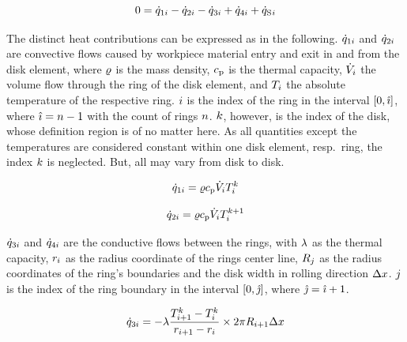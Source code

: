 \documentclass{PyRollDocs}
\begin{document}
    \begin{equation}
        0 = {\dot{q}}_{1{i}} - {\dot{q}}_{2{i}} - {\dot{q}}_{3{i}} + {\dot{q}}_{4{i}} + {\dot{q}_\mathrm{S}}{}_{{i}}
        \label{eq:heat_flow_balance}
    \end{equation}

    The distinct heat contributions can be expressed as in the following.
    ${\dot{q}}_{1{i}}$ and ${\dot{q}}_{2{i}}$ are convective flows caused by workpiece material entry and exit in and from the disk element, where ${\varrho}$ is the mass density, ${c_\mathrm{p}}$ is the thermal capacity, ${\dot{V}}_{i}$ the volume flow through the ring of the disk element, and ${T}_{i}$ the absolute temperature of the respective ring.
    ${i}$ is the index of the ring in the interval $[0, {\hat{\imath}}]$, where ${\hat{\imath}} = {n} - 1$ with the count of rings ${n}$.
    ${k}$, however, is the index of the disk, whose definition region is of no matter here.
    As all quantities except the temperatures are considered constant within one disk element, resp.\ ring, the index ${k}$ is neglected.
    But, all may vary from disk to disk.

    \begin{equation}
        {\dot{q}}_{1{i}} = {\varrho} {c_\mathrm{p}} {\dot{V}}_{i} {T}_{{i}}^{{k}}
        \label{eq:heat_flow_1}
    \end{equation}

    \begin{equation}
        {\dot{q}}_{2{i}} = {\varrho} {c_\mathrm{p}} {\dot{V}}_{i} {T}_{{i}}^{{k}+1}
        \label{eq:heat_flow_2}
    \end{equation}

    ${\dot{q}}_{3{i}}$ and ${\dot{q}}_{4{i}}$ are the conductive flows between the rings, with ${\lambda}$ as the thermal capacity, ${r}_{i}$ as the radius coordinate of the rings center line, ${R}_{j}$ as the radius coordinates of the ring's boundaries and the disk width in rolling direction ${\Delta x}$.
    ${j}$ is the index of the ring boundary in the interval $[0, {\hat{\jmath}}]$, where ${\hat{\jmath}} = {\hat{\imath}} + 1$.

    \begin{equation}
        {\dot{q}}_{3{i}} = -{\lambda} \frac{{T}_{{i}+1}^{{k}}-{T}_{{i}}^{{k}}}{{r}_{{i}+1} - {r}_{{i}}} \times 2 \pi {R}_{{i}+1} {\Delta x}
        \label{eq:heat_flow_3}
    \end{equation}
\end{document}
